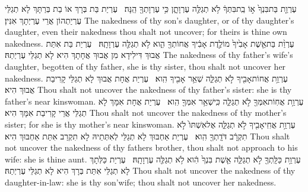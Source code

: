 {עֶרְוַ֤ת בַּת\maqqaf בִּנְךָ֙ א֣וֹ בַֽת\maqqaf בִּתְּךָ֔ לֹ֥א תְגַלֶּ֖ה עֶרְוָתָ֑ן כִּ֥י עֶרְוָתְךָ֖ הֵֽנָּה׃ \setuma }
{עֶרְיַת בַּת בְּרָךְ אוֹ בַת בְּרַתָּךְ לָא תְגַלֵּי עֶרְיַתְהוֹן אֲרֵי עֶרְיְתָךְ אִנִּין׃}
{The nakedness of thy son’s daughter, or of thy daughter’s daughter, even their nakedness thou shalt not uncover; for theirs is thine own nakedness.}{}
{עֶרְוַ֨ת בַּת\maqqaf אֵ֤שֶׁת אָבִ֙יךָ֙ מוֹלֶ֣דֶת אָבִ֔יךָ אֲחוֹתְךָ֖ הִ֑וא לֹ֥א תְגַלֶּ֖ה עֶרְוָתָֽהּ׃ \setuma }
{עֶרְיַת בַּת אִתַּת אֲבוּךְ דִּילִידָא מִן אֲבוּךְ אֲחָתָךְ הִיא לָא תְגַלֵּי עֶרְיְתַהּ׃}
{The nakedness of thy father’s wife’s daughter, begotten of thy father, she is thy sister, thou shalt not uncover her nakedness.}{}
{עֶרְוַ֥ת אֲחוֹת\maqqaf אָבִ֖יךָ לֹ֣א תְגַלֵּ֑ה שְׁאֵ֥ר אָבִ֖יךָ הִֽוא׃ \setuma }
{עֶרְיַת אֲחָת אֲבוּךְ לָא תְגַלֵּי קָרִיבַת אֲבוּךְ הִיא׃}
{Thou shalt not uncover the nakedness of thy father’s sister: she is thy father’s near kinswoman.}{}
{עֶרְוַ֥ת אֲחֽוֹת\maqqaf אִמְּךָ֖ לֹ֣א תְגַלֵּ֑ה כִּֽי\maqqaf שְׁאֵ֥ר אִמְּךָ֖ הִֽוא׃ \setuma }
{עֶרְיַת אֲחָת אִמָּךְ לָא תְגַלֵּי אֲרֵי קָרִיבַת אִמָּךְ הִיא׃}
{Thou shalt not uncover the nakedness of thy mother’s sister; for she is thy mother’s near kinswoman.}{}
{עֶרְוַ֥ת אֲחִֽי\maqqaf אָבִ֖יךָ לֹ֣א תְגַלֵּ֑ה אֶל\maqqaf אִשְׁתּוֹ֙ לֹ֣א תִקְרָ֔ב דֹּדָֽתְךָ֖ הִֽוא׃ \setuma }
{עֶרְיַת אַחְבּוּךְ לָא תְגַלֵּי לְאִתְּתֵיהּ לָא תִקְרַב אִתַּת אַחְבּוּךְ הִיא׃}
{Thou shalt not uncover the nakedness of thy fathers brother, thou shalt not approach to his wife: she is thine aunt.}{}
{עֶרְוַ֥ת כַּלָּֽתְךָ֖ לֹ֣א תְגַלֵּ֑ה אֵ֤שֶׁת בִּנְךָ֙ הִ֔וא לֹ֥א תְגַלֶּ֖ה עֶרְוָתָֽהּ׃ \setuma }
{עֶרְיַת כַּלְּתָךְ לָא תְגַלֵּי אִתַּת בְּרָךְ הִיא לָא תְגַלֵּי עֶרְיְתַהּ׃}
{Thou shalt not uncover the nakedness of thy daughter-in-law: she is thy son’wife; thou shalt not uncover her nakedness.}{}
